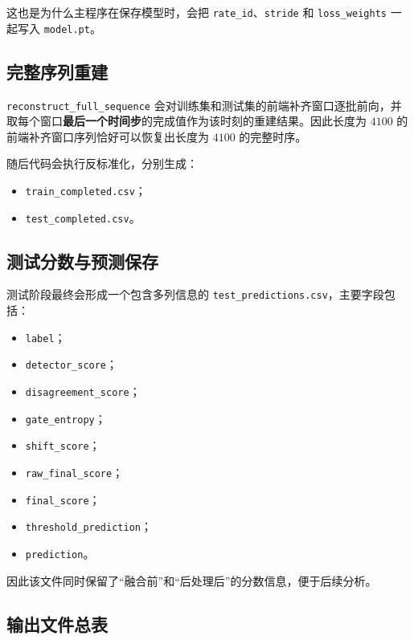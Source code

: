 \documentclass[UTF8]{ctexart}
\newcommand{\code}[1]{\texttt{#1}}
\begin{document}
这也是为什么主程序在保存模型时，会把 \code{rate\_id}、\code{stride} 和 \code{loss\_weights} 一起写入 \code{model.pt}。

\subsection{完整序列重建}

\code{reconstruct\_full\_sequence} 会对训练集和测试集的前端补齐窗口逐批前向，并取每个窗口\textbf{最后一个时间步}的完成值作为该时刻的重建结果。因此长度为 \(4100\) 的前端补齐窗口序列恰好可以恢复出长度为 \(4100\) 的完整时序。

随后代码会执行反标准化，分别生成：
\begin{itemize}
    \item \code{train\_completed.csv}；
    \item \code{test\_completed.csv}。
\end{itemize}

\subsection{测试分数与预测保存}

测试阶段最终会形成一个包含多列信息的 \code{test\_predictions.csv}，主要字段包括：
\begin{itemize}
    \item \code{label}；
    \item \code{detector\_score}；
    \item \code{disagreement\_score}；
    \item \code{gate\_entropy}；
    \item \code{shift\_score}；
    \item \code{raw\_final\_score}；
    \item \code{final\_score}；
    \item \code{threshold\_prediction}；
    \item \code{prediction}。
\end{itemize}

因此该文件同时保留了“融合前”和“后处理后”的分数信息，便于后续分析。

\subsection{输出文件总表}
\end{document}

